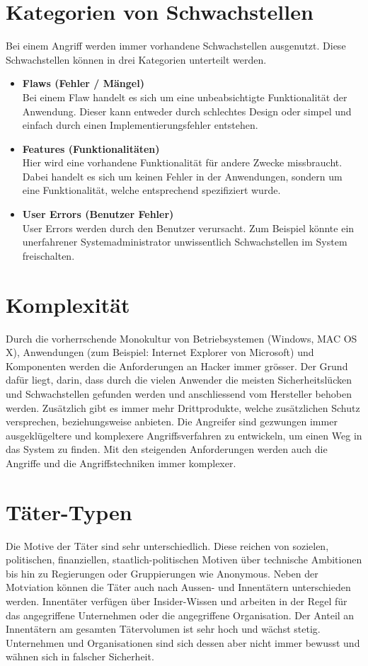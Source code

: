 \section{Kategorien von Schwachstellen}
Bei einem Angriff werden immer vorhandene Schwachstellen ausgenutzt. Diese Schwachstellen können in drei Kategorien unterteilt werden.

\begin{itemize}
\item \textbf{Flaws (Fehler / Mängel)} \\
Bei einem Flaw handelt es sich um eine unbeabsichtigte Funktionalität der Anwendung. Dieser kann entweder durch schlechtes Design oder simpel und einfach durch einen Implementierungsfehler entstehen.
\item \textbf{Features (Funktionalitäten)} \\
Hier wird eine vorhandene Funktionalität für andere Zwecke missbraucht. Dabei handelt es sich um keinen Fehler in der Anwendungen, sondern um eine Funktionalität, welche entsprechend spezifiziert wurde.
\item \textbf{User Errors (Benutzer Fehler)} \\
User Errors werden durch den Benutzer verursacht. Zum Beispiel könnte ein unerfahrener Systemadministrator unwissentlich Schwachstellen im System freischalten.
\end{itemize}


\section{Komplexität}
Durch die vorherrschende Monokultur von Betriebsystemen (Windows, MAC OS X), Anwendungen (zum Beispiel: Internet Explorer von Microsoft) und Komponenten werden die Anforderungen an Hacker immer grösser. Der Grund dafür liegt, darin, dass durch die vielen Anwender die meisten Sicherheitslücken und Schwachstellen gefunden werden und anschliessend vom Hersteller behoben werden. Zusätzlich gibt es immer mehr Drittprodukte, welche zusätzlichen Schutz versprechen, beziehungsweise anbieten. Die Angreifer sind gezwungen immer ausgeklügeltere und komplexere Angriffsverfahren zu entwickeln, um einen Weg in das System zu finden. Mit den steigenden Anforderungen werden auch die Angriffe und die Angriffstechniken immer komplexer.



\section{Täter-Typen}
Die Motive der Täter sind sehr unterschiedlich. Diese reichen von sozielen, politischen, finanziellen, staatlich-politischen Motiven über technische Ambitionen bis hin zu Regierungen oder Gruppierungen wie Anonymous. Neben der Motviation können die Täter auch nach Aussen- und Innentätern unterschieden werden. Innentäter verfügen über Insider-Wissen und arbeiten in der Regel für das angegriffene Unternehmen oder die angegriffene Organisation. Der Anteil an Innentätern am gesamten Tätervolumen ist sehr hoch und wächst stetig. Unternehmen und Organisationen sind sich dessen aber nicht immer bewusst und wähnen sich in falscher Sicherheit.

